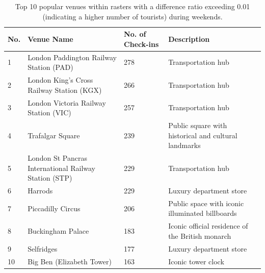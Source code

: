 \documentclass{article}
\begin{document}
\begin{table}[!h]
\centering
\caption{\label{tab:popular_venues_touristspop_weekend}Top 10 popular venues within rasters with a difference ratio exceeding 0.01 (indicating a higher number of tourists) during weekends.}
\begin{adjustbox}{max width=\textwidth, margin=0cm}
\begin{threeparttable}
\begin{tabular}{lp{5cm}lp{4cm}} \hline
No. & Venue Name & No. of Check-ins & Description \\ \hline
1 & London Paddington Railway Station (PAD) & 278 & Transportation hub \\
2 & London King's Cross Railway Station (KGX) & 266 & Transportation hub \\
3 & London Victoria Railway Station (VIC) & 257 & Transportation hub \\
4 & Trafalgar Square & 239 & Public square with historical and cultural landmarks \\
5 & London St Pancras International Railway Station (STP) & 229 & Transportation hub \\
6 & Harrods & 229 & Luxury department store \\
7 & Piccadilly Circus & 206 & Public space with iconic illuminated billboards \\
8 & Buckingham Palace & 183 & Iconic official residence of the British monarch \\
9 & Selfridges & 177 & Luxury department store \\
10 & Big Ben (Elizabeth Tower) & 163 & Iconic tower clock \\ \hline
\end{tabular}
\end{threeparttable}
\end{adjustbox}
\end{table}
\end{document}
